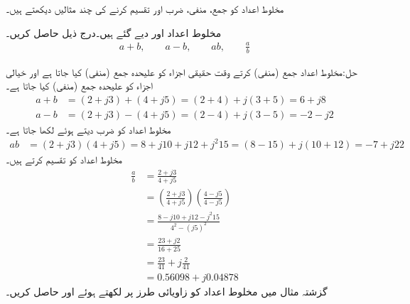 مخلوط اعداد کو جمع، منفی، ضرب اور تقسیم کرنے کی چند مثالیں دیکھتے ہیں۔

مخلوط اعداد  اور  دیے گئے ہیں۔درج ذیل حاصل کریں۔
\begin{align*}
a+b, \quad \quad a-b, \quad \quad a b, \quad \quad \frac{a}{b}
\end{align*}

حل:مخلوط اعداد جمع (منفی) کرتے وقت حقیقی اجزاء کو علیحدہ جمع (منفی) کیا جاتا ہے اور خیالی اجزاء کو علیحدہ جمع (منفی) کیا جاتا ہے۔
\begin{align*}
a+b&=(2+j3)+(4+j5)=(2+4)+j(3+5)=6+j8\\
a-b&=(2+j3)-(4+j5)=(2-4)+j(3-5)=-2-j2
\end{align*}
مخلوط اعداد کو ضرب دیتے ہوئے  لکھا جاتا ہے۔
\begin{align*}
ab&=(2+j3)(4+j5)=8+j10+j12+j^2 15=(8-15)+j(10+12)=-7+j22
\end{align*}
مخلوط اعداد کو تقسیم کرتے ہیں۔
\begin{align*}
\frac{a}{b}&=\frac{2+j3}{4+j5}\\
&=\left(\frac{2+j3}{4+j5}\right)\left(\frac{4-j5}{4-j5}\right)\\
&=\frac{8-j10+j12-j^2 15}{4^2-(j 5)^2}\\
&=\frac{23+j2}{16+25}\\
&=\frac{23}{41}+j\frac{2}{41}\\
&=0.56098+j0.04878
\end{align*}
گزشتہ مثال میں مخلوط اعداد کو زاویائی طرز پر لکھتے ہوئے  اور  حاصل کریں۔

